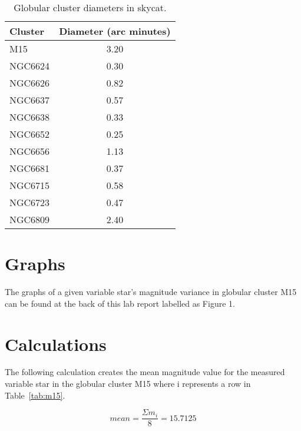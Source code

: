\documentclass{article}
\begin{document}
\begin{table}[h!]
\begin{center}
\begin{tabular}{l c}
\hline
Cluster & Diameter (arc minutes)\\
\hline
\hline
M15 & 3.20\\
NGC6624 & 0.30\\
NGC6626 & 0.82\\
NGC6637 & 0.57\\
NGC6638 & 0.33\\
NGC6652 & 0.25\\
NGC6656 & 1.13\\
NGC6681 & 0.37\\
NGC6715 & 0.58\\
NGC6723 & 0.47\\
NGC6809 & 2.40\\
\hline
\end{tabular}
\end{center}
\caption{Globular cluster diameters in skycat.\label{tab:size}}
\end{table}


\section{Graphs}

The graphs of a given variable star's magnitude variance in globular cluster M15
can be found at the back of this lab report labelled as Figure 1.


\section{Calculations}
\label{sec:calc}

The following calculation creates the mean magnitude value for the measured variable star in
the globular cluster M15 where i represents a row in Table~\ref{tab:m15}.

\begin{equation}
\label{calc:m}
mean = \frac{\Sigma m_{i}}{8} = 15.7125
\end{equation}
\end{document}
